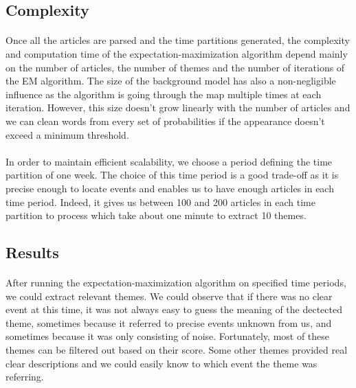 \subsection{Complexity}

\paragraph{}
Once all the articles are parsed and the time partitions generated, the complexity and computation time of the expectation-maximization algorithm depend mainly on the number of articles, the number of themes and the number of iterations of the EM algorithm.
The size of the background model has also a non-negligible influence as the algorithm is going through the map multiple times at each iteration. However, this size doesn't grow linearly with the number of articles and we can clean words from every set of probabilities if the appearance doesn't exceed a minimum threshold.

\paragraph{}
In order to maintain efficient scalability, we choose a period defining the time partition of one week. The choice of this time period is a good trade-off as it is precise enough to locate events and enables us to have enough articles in each time period. Indeed, it gives us between 100 and 200 articles in each time partition to process which take about one minute to extract 10 themes.

\subsection{Results}

\paragraph{}
After running the expectation-maximization algorithm on specified time periods, we could extract relevant themes. We could observe that if there was no clear event at this time, it was not always easy to guess the meaning of the dectected theme, sometimes because it referred to precise events unknown from us, and sometimes because it was only consisting of noise. Fortunately, most of these themes can be filtered out based on their score. Some other themes provided real clear descriptions and we could easily know to which event the theme was referring.

